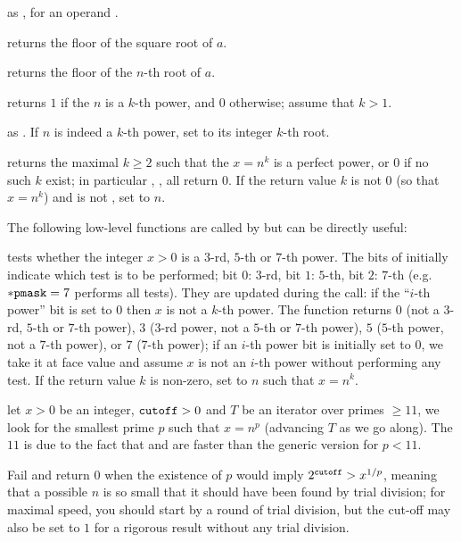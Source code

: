  as ,
for an  operand .

 returns the floor of the square root of $a$.

 returns the floor of the $n$-th root
of $a$.

 returns $1$ if the  $n$ is a
$k$-th power, and $0$ otherwise; assume that $k > 1$.

 as . If
$n$ is indeed a $k$-th power, set  to its integer $k$-th root.

 returns the maximal $k\geq 2$  such
that the  $x = n^k$ is a perfect power, or $0$ if no such $k$ exist;
in particular , ,  all
return 0. If the return value $k$ is not $0$ (so that $x = n^k$) and
 is not , set  to $n$.

The following low-level functions are called by  but can
be directly useful:

 tests whether the
integer $x > 0$ is a $3$-rd, $5$-th or $7$-th power. The bits of 
initially indicate which test is to be performed;
bit $0$: $3$-rd,
bit $1$: $5$-th,
bit $2$: $7$-th (e.g.~${\tt *pmask} = 7$ performs all tests). They are
updated during the call: if the ``$i$-th power'' bit is set to $0$
then $x$ is not a $k$-th power. The function returns $0$
(not a
$3$-rd,
$5$-th or
$7$-th power),
$3$
($3$-rd power,
not a $5$-th or
$7$-th power),
$5$
($5$-th power,
not a $7$-th power),
or $7$
($7$-th power); if an $i$-th power bit is initially set to $0$, we take it
at face value and assume $x$ is not an $i$-th power without performing any
test. If the return value $k$ is non-zero, set  to $n$ such that $x
= n^k$.

let $x > 0$ be an integer, ${\tt cutoff} > 0$ and $T$ be an iterator over
primes $\geq 11$, we look for the smallest prime $p$ such that $x = n^p$
(advancing $T$ as we go along). The $11$ is due to the fact that
 and  are faster than the generic version for
$p < 11$.

Fail and return $0$ when the existence of $p$ would imply $2^{{\tt cutoff}} >
x^{1/p}$, meaning that a possible $n$ is so small that it should have been
found by trial division; for maximal speed, you should start by a round of
trial division, but the cut-off may also be set to $1$ for a rigorous result
without any trial division.


